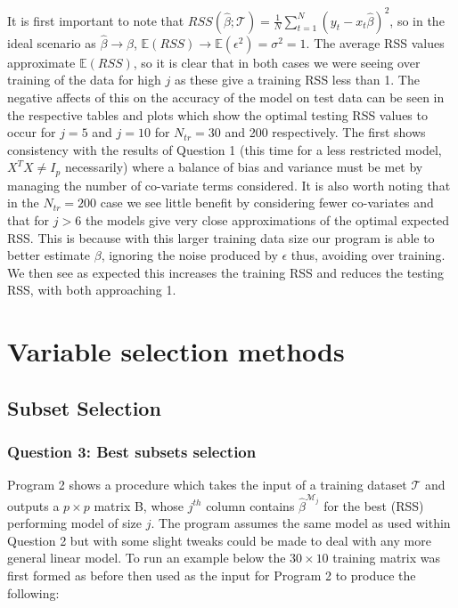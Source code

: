 \documentclass{article}
\begin{document}
It is first important to note that $RSS(\hat{\beta};\mathcal{T})= \frac{1}{N} \sum_{t=1}^N(y_t-x_t \hat{\beta})^2$, so in the ideal scenario as $\hat{\beta} \to \beta$, $\mathbb{E}(RSS) \to \mathbb{E}(\epsilon^2)=\sigma^2=1$. The average RSS values approximate $\mathbb{E}(RSS)$, so it is clear that in both cases we were seeing over training of the data for high $j$ as these give a training RSS less than 1. The negative affects of this on the accuracy of the model on test data can be seen in the respective tables and plots which show the optimal testing RSS values to occur for $j=5$ and $j=10$ for $N_{tr}=30$ and 200 respectively. The first shows consistency with the results of Question 1 (this time for a less restricted model, $X^T X \neq I_p$ necessarily) where a balance of bias and variance must be met by managing the number of co-variate terms considered. It is also worth noting that in the $N_{tr}=200$ case we see little benefit by considering fewer co-variates and that for $j>6$ the models give very close approximations of the optimal expected RSS. This is because with this larger training data size our program is able to better estimate $\beta$, ignoring the noise produced by $\epsilon$ thus, avoiding over training. We then see as expected this increases the training RSS and reduces the testing RSS, with both approaching 1.

\section{Variable selection methods}

\subsection{Subset Selection}

\subsubsection{Question 3: Best subsets selection}

Program 2 shows a procedure which takes the input of a training dataset $\mathcal{T}$  and outputs a $p \times p$ matrix B, whose $j^{th}$ column contains $\hat{\beta}^{\mathcal{M}_j}$ for the best (RSS) performing model of size $j$. The program assumes the same model as used within Question 2 but with some slight tweaks could be made to deal with any more general linear model. To run an example below the $30 \times 10$ training matrix was first formed as before then used as the input for Program 2 to produce the following:
\end{document}
